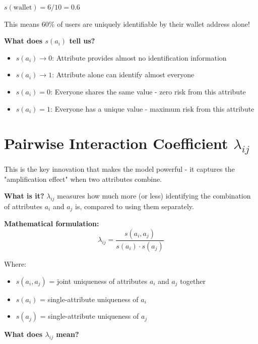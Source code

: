 \documentclass[12pt,a4paper,oneside,openany]{report}
\begin{document}
$s(\text{wallet}) = 6/10 = 0.6$

This means 60\% of users are uniquely identifiable by their wallet address alone!

\textbf{What does $s(a_i)$ tell us?}
\begin{itemize}
    \item $s(a_i) \rightarrow 0$: Attribute provides almost no identification information
    \item $s(a_i) \rightarrow 1$: Attribute alone can identify almost everyone
    \item $s(a_i) = 0$: Everyone shares the same value - zero risk from this attribute
    \item $s(a_i) = 1$: Everyone has a unique value - maximum risk from this attribute
\end{itemize}

\section{Pairwise Interaction Coefficient $\lambda_{ij}$}
\label{sec:lambda}

This is the key innovation that makes the model powerful - it captures the "amplification effect" when two attributes combine.

\textbf{What is it?} $\lambda_{ij}$ measures how much more (or less) identifying the combination of attributes $a_i$ and $a_j$ is, compared to using them separately.

\textbf{Mathematical formulation:}
\begin{equation}
\lambda_{ij} = \frac{s(a_i, a_j)}{s(a_i) \cdot s(a_j)}
\end{equation}

Where:
\begin{itemize}
    \item $s(a_i, a_j)$ = joint uniqueness of attributes $a_i$ and $a_j$ together
    \item $s(a_i)$ = single-attribute uniqueness of $a_i$
    \item $s(a_j)$ = single-attribute uniqueness of $a_j$
\end{itemize}

\textbf{What does $\lambda_{ij}$ mean?}
\end{document}
